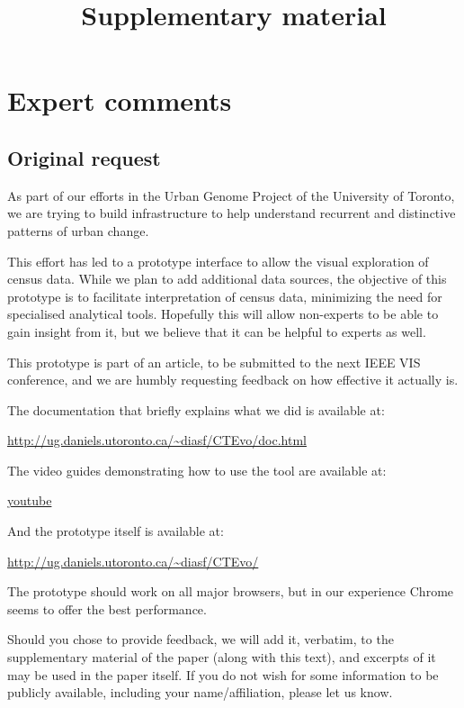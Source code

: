 \documentclass[a4paper]{article}
\title{Supplementary material}
\author{}
\date{}
\begin{document}
\maketitle


\section{Expert comments}


\subsection{Original request}
As part of our efforts in the Urban Genome Project of the University of Toronto,
we are trying to build infrastructure to help understand recurrent and
distinctive patterns of urban change.

This effort has led to a prototype interface to allow the visual exploration of
census data. While we plan to add additional data sources, the objective of this
prototype is to facilitate interpretation of census data, minimizing the need
for specialised analytical tools. Hopefully this will allow non-experts to be
able to gain insight from it, but we believe that it can be helpful to experts
as well.  

This prototype is part of an article, to be submitted to the next IEEE VIS
conference, and we are humbly requesting feedback on how effective it actually
is.

The documentation that briefly explains what we did is available at:

\href{http://ug.daniels.utoronto.ca/~diasf/CTEvo/doc.html}{\url{http://ug.daniels.utoronto.ca/~diasf/CTEvo/doc.html}}

The video guides demonstrating how to use the tool are available at:

\href{https://www.youtube.com/watch?v=OZFUA0ThEaY&list=PLBd6KRI4PG-RcxAX35OfHd1DKl3qWfXRV}{youtube}

And the prototype itself is available at:

\href{http://ug.daniels.utoronto.ca/~diasf/CTEvo/}{\url{http://ug.daniels.utoronto.ca/~diasf/CTEvo/}}

The prototype should work on all major browsers, but in our experience Chrome
seems to offer the best performance.

Should you chose to provide feedback, we will add it, verbatim, to the
supplementary material of the paper (along with this text), and excerpts of it
may be used in the paper itself. If you do not wish for some information to be
publicly available, including your name/affiliation, please let us know.
\end{document}
